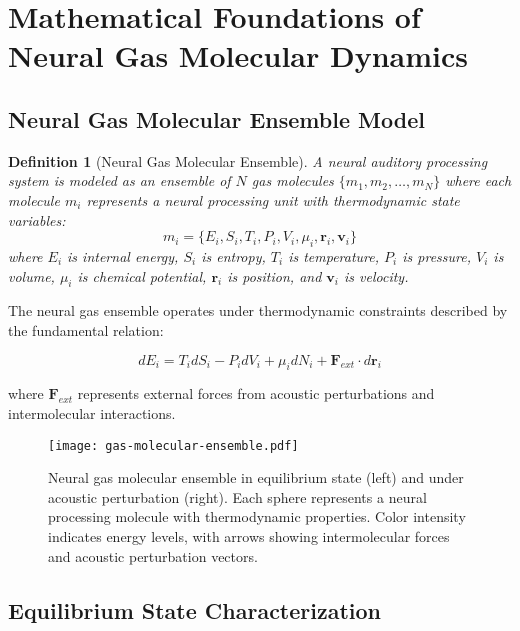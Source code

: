 \documentclass[12pt,a4paper]{article}
\newtheorem{definition}[theorem]{Definition}
\begin{document}
\section{Mathematical Foundations of Neural Gas Molecular Dynamics}

\subsection{Neural Gas Molecular Ensemble Model}

\begin{definition}[Neural Gas Molecular Ensemble]
A neural auditory processing system is modeled as an ensemble of $N$ gas molecules $\{m_1, m_2, \ldots, m_N\}$ where each molecule $m_i$ represents a neural processing unit with thermodynamic state variables:
\begin{equation}
m_i = \{E_i, S_i, T_i, P_i, V_i, \mu_i, \mathbf{r}_i, \mathbf{v}_i\}
\end{equation}
where $E_i$ is internal energy, $S_i$ is entropy, $T_i$ is temperature, $P_i$ is pressure, $V_i$ is volume, $\mu_i$ is chemical potential, $\mathbf{r}_i$ is position, and $\mathbf{v}_i$ is velocity.
\end{definition}

The neural gas ensemble operates under thermodynamic constraints described by the fundamental relation:

\begin{equation}
dE_i = T_i dS_i - P_i dV_i + \mu_i dN_i + \mathbf{F}_{ext} \cdot d\mathbf{r}_i
\end{equation}

where $\mathbf{F}_{ext}$ represents external forces from acoustic perturbations and intermolecular interactions.

\begin{figure}[h]
\centering
\texttt{[image: gas-molecular-ensemble.pdf]}
\caption{Neural gas molecular ensemble in equilibrium state (left) and under acoustic perturbation (right). Each sphere represents a neural processing molecule with thermodynamic properties. Color intensity indicates energy levels, with arrows showing intermolecular forces and acoustic perturbation vectors.}
\label{fig:molecular_ensemble}
\end{figure}

\subsection{Equilibrium State Characterization}
\end{document}

